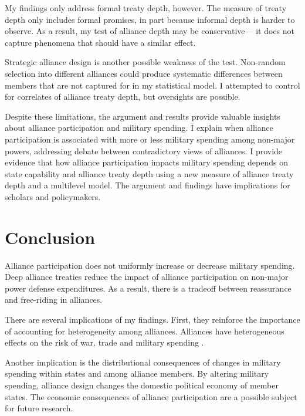 \documentclass[12pt]{article}
\begin{document}
My findings only address formal treaty depth, however. 
The measure of treaty depth only includes formal promises, in part because informal depth is harder to observe. 
As a result, my test of alliance depth may be conservative--- it does not capture phenomena that should have a similar effect. 


Strategic alliance design is another possible weakness of the test. 
Non-random selection into different alliances could produce systematic differences between members that are not captured for in my statistical model. 
I attempted to control for correlates of alliance treaty depth, but oversights are possible.


Despite these limitations, the argument and results provide valuable insights about alliance participation and military spending. 
I explain when alliance participation is associated with more or less military spending among non-major powers, addressing debate between contradictory views of alliances.  
I provide evidence that how alliance participation impacts military spending depends on state capability and alliance treaty depth using a new measure of alliance treaty depth and a multilevel model. 
The argument and findings have implications for scholars and policymakers. 


\section{Conclusion}

Alliance participation does not uniformly increase or decrease military spending. 
Deep alliance treaties reduce the impact of alliance participation on non-major power defense expenditures. 
As a result, there is a tradeoff between reassurance and free-riding in alliances. 


There are several implications of my findings.  
First, they reinforce the importance of accounting for heterogeneity among alliances.
Alliances have heterogeneous effects on the risk of war, trade and military spending \citep{Leeds2003, LongLeeds2006, Benson2012, DigiuseppePoast2016}. 


Another implication is the distributional consequences of changes in military spending within states and among alliance members.  
By altering military spending, alliance design changes the domestic political economy of member states. 
The economic consequences of alliance participation are a possible subject for future research. 
\end{document}
